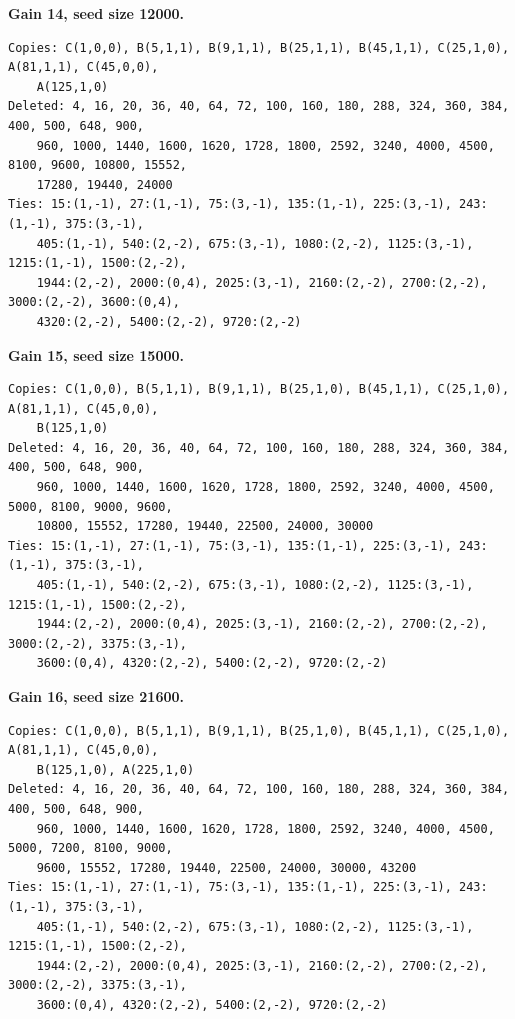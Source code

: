 \noindent\textbf{Gain 14, seed size 12000.}
\begin{scriptsize}
\begin{verbatim}
Copies: C(1,0,0), B(5,1,1), B(9,1,1), B(25,1,1), B(45,1,1), C(25,1,0), A(81,1,1), C(45,0,0),
    A(125,1,0)
Deleted: 4, 16, 20, 36, 40, 64, 72, 100, 160, 180, 288, 324, 360, 384, 400, 500, 648, 900,
    960, 1000, 1440, 1600, 1620, 1728, 1800, 2592, 3240, 4000, 4500, 8100, 9600, 10800, 15552,
    17280, 19440, 24000
Ties: 15:(1,-1), 27:(1,-1), 75:(3,-1), 135:(1,-1), 225:(3,-1), 243:(1,-1), 375:(3,-1),
    405:(1,-1), 540:(2,-2), 675:(3,-1), 1080:(2,-2), 1125:(3,-1), 1215:(1,-1), 1500:(2,-2),
    1944:(2,-2), 2000:(0,4), 2025:(3,-1), 2160:(2,-2), 2700:(2,-2), 3000:(2,-2), 3600:(0,4),
    4320:(2,-2), 5400:(2,-2), 9720:(2,-2)
\end{verbatim}
\end{scriptsize}

\noindent\textbf{Gain 15, seed size 15000.}
\begin{scriptsize}
\begin{verbatim}
Copies: C(1,0,0), B(5,1,1), B(9,1,1), B(25,1,0), B(45,1,1), C(25,1,0), A(81,1,1), C(45,0,0),
    B(125,1,0)
Deleted: 4, 16, 20, 36, 40, 64, 72, 100, 160, 180, 288, 324, 360, 384, 400, 500, 648, 900,
    960, 1000, 1440, 1600, 1620, 1728, 1800, 2592, 3240, 4000, 4500, 5000, 8100, 9000, 9600,
    10800, 15552, 17280, 19440, 22500, 24000, 30000
Ties: 15:(1,-1), 27:(1,-1), 75:(3,-1), 135:(1,-1), 225:(3,-1), 243:(1,-1), 375:(3,-1),
    405:(1,-1), 540:(2,-2), 675:(3,-1), 1080:(2,-2), 1125:(3,-1), 1215:(1,-1), 1500:(2,-2),
    1944:(2,-2), 2000:(0,4), 2025:(3,-1), 2160:(2,-2), 2700:(2,-2), 3000:(2,-2), 3375:(3,-1),
    3600:(0,4), 4320:(2,-2), 5400:(2,-2), 9720:(2,-2)
\end{verbatim}
\end{scriptsize}

\noindent\textbf{Gain 16, seed size 21600.}
\begin{scriptsize}
\begin{verbatim}
Copies: C(1,0,0), B(5,1,1), B(9,1,1), B(25,1,0), B(45,1,1), C(25,1,0), A(81,1,1), C(45,0,0),
    B(125,1,0), A(225,1,0)
Deleted: 4, 16, 20, 36, 40, 64, 72, 100, 160, 180, 288, 324, 360, 384, 400, 500, 648, 900,
    960, 1000, 1440, 1600, 1620, 1728, 1800, 2592, 3240, 4000, 4500, 5000, 7200, 8100, 9000,
    9600, 15552, 17280, 19440, 22500, 24000, 30000, 43200
Ties: 15:(1,-1), 27:(1,-1), 75:(3,-1), 135:(1,-1), 225:(3,-1), 243:(1,-1), 375:(3,-1),
    405:(1,-1), 540:(2,-2), 675:(3,-1), 1080:(2,-2), 1125:(3,-1), 1215:(1,-1), 1500:(2,-2),
    1944:(2,-2), 2000:(0,4), 2025:(3,-1), 2160:(2,-2), 2700:(2,-2), 3000:(2,-2), 3375:(3,-1),
    3600:(0,4), 4320:(2,-2), 5400:(2,-2), 9720:(2,-2)
\end{verbatim}
\end{scriptsize}
